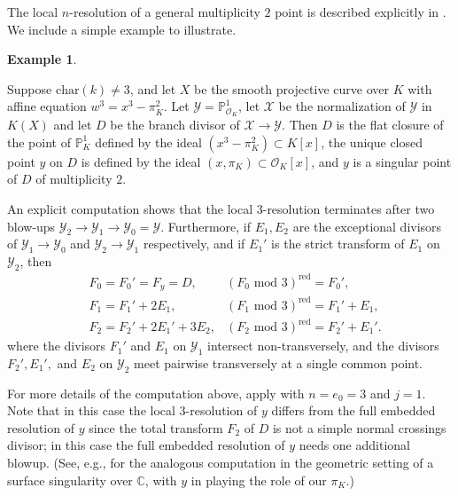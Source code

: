 \documentclass[12pt]{amsart}
\numberwithin{equation}{section}
\theoremstyle{definition}
\newtheorem{example}[equation]{Example}
\renewcommand{\O}{\mathcal{O}}
\renewcommand{\P}{\mathbb P}
\newcommand{\X}{\mathcal{X}}
\newcommand{\Y}{\mathcal{Y}}
\newcommand{\tx}[1]{\text{#1}}
\begin{document}
The local $n$-resolution of a general multiplicity $2$ point is described explicitly in \cite[Section 3]{Part2}. We include a simple example to illustrate. 

\begin{example}\label{example: local n-resolution}
     
Suppose $\tx{char}(k)\neq 3$, and let $X$ be the smooth projective curve over $K$ with affine equation $w^3=x^3-\pi_K^2$. Let $\Y=\P^1_{\O_K}$, let $\X$ be the normalization of $\Y$ in $K(X)$ and let $D$ be the branch divisor of $\X \rightarrow \Y$. Then $D$ is the flat closure of the point of $\P^1_K$ defined by the ideal $(x^3-\pi_K^2)\subset K[x]$, the unique closed point $y$ on $D$ is defined by the ideal $(x,\pi_K)\subset \O_K[x]$, and $y$ is a singular point of $D$ of multiplicity $2$. 
    
    
 
  An explicit computation shows that the local $3$-resolution terminates after two blow-ups $\Y_2\to\Y_1\to\Y_0=\Y$. Furthermore, if $E_1,E_2$ are the exceptional divisors of $\Y_1\to\Y_0$ and $\Y_2\to\Y_1$ respectively, and if $E_1'$ is the strict transform of $E_1$ on $\Y_2$, then
    \begin{align*}
     &F_0=F_0'=F_y=D, &(F_0\tx{ mod }3)^\tx{red}=F_0', \\
     &F_1=F_1'+2E_1, &(F_1\tx{ mod }3)^\tx{red}=F_1'+E_1, \\
     &F_2=F_2'+2E_1'+3E_2, &(F_2\tx{ mod }3)^\tx{red}=F_2'+E_1'.
    \end{align*}
where the divisors $F_1'$ and $E_1$ on $\Y_1$ intersect non-transversely, and the divisors $F_2',E_1',$ and $E_2$ on $\Y_2$ meet pairwise transversely at a single common point.

For more details of the computation above, apply \cite[Propositions 3.7, 3.11, and 3.13]{Part2} with $n=e_0=3$ and $j=1$. Note that in this case the local $3$-resolution of $y$ differs from the full embedded resolution of $y$ since the total transform $F_2$ of $D$ is not a simple normal crossings divisor; in this case the full embedded resolution of $y$ needs one additional blowup. (See, e.g., \cite[Chapter~V, Example~3.9.1]{hartshorne} for the analogous computation in the geometric setting of a surface singularity over $\mathbb{C}$, with $y$ in \cite{hartshorne} playing the role of our $\pi_K$.)
    

\end{example}
\end{document}
